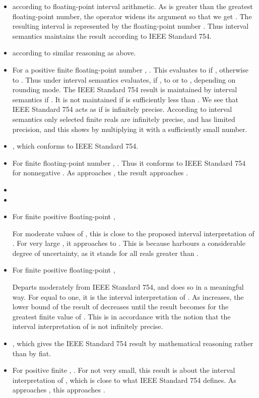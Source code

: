 \documentclass[11pt]{article}
\begin{document}
\begin{itemize}
\item

according to floating-point interval arithmetic.
As  is greater than the greatest floating-point number,
the  operator widens its argument so that we get
.
The resulting interval is represented by the floating-point number .
Thus interval semantics maintains the result according to IEEE Standard 754.
\item
 according to similar
reasoning as above.
\item
For a positive finite floating-point number ,
.
This evaluates to  if ,
otherwise to .
Thus under interval semantics  evaluates, if , to
 or to , depending on rounding mode.
The IEEE Standard 754 result is maintained by interval semantics if .
It is not maintained if  is sufficiently less than .
We see that IEEE Standard 754 acts as if  is infinitely precise.
According to interval semantics only selected finite reals are
infinitely precise, and  has limited precision,
and this shows by multiplying it with a sufficiently small number.
\item
,
which conforms to IEEE Standard 754.
\item
For finite floating-point number ,
.
Thus it conforms to IEEE Standard 754 for nonnegative .
As  approaches , the  result approaches .
\item

\item

\item
For finite positive floating-point ,

For moderate values of , this is close to the proposed interval
interpretation of . For very large , it approaches to .
This is because  harbours a considerable degree of
uncertainty, as it stands for all reals greater than .
\item
For finite positive floating-point ,

Departs moderately from IEEE Standard 754, and does so in a meaningful
way.  For  equal to one, it is the interval interpretation of
.  As  increases, the lower bound of the result of
 decreases until the result becomes  for the
greatest finite value of .  This is in accordance with the notion
that the interval interpretation of  is not infinitely
precise.
\item ,
which gives the IEEE Standard 754 result by mathematical reasoning rather than
by fiat.
\item
For positive finite ,
.
For  not very small, this result is about the interval
interpretation of , which is close to what IEEE Standard 754 defines.
As  approaches , this approaches .
\end{itemize}
\end{document}
